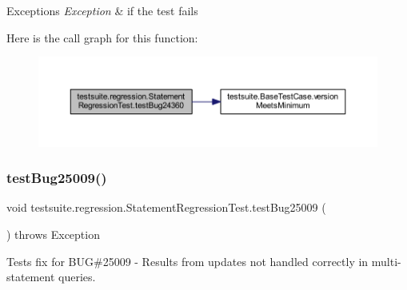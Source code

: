 \begin{DoxyExceptions}{Exceptions}
{\em Exception} & if the test fails \\
\hline
\end{DoxyExceptions}
Here is the call graph for this function\+:
\nopagebreak
\begin{figure}[H]
\begin{center}
\leavevmode
\includegraphics[width=350pt]{classtestsuite_1_1regression_1_1_statement_regression_test_a3334c82a4ef7ac982bf6eca6fc081027_cgraph}
\end{center}
\end{figure}
\mbox{\label{classtestsuite_1_1regression_1_1_statement_regression_test_a857b7ade8c7c4e47bd7f0c8340d91386}} 
\subsubsection{\texorpdfstring{test\+Bug25009()}{testBug25009()}}
{\footnotesize\ttfamily void testsuite.\+regression.\+Statement\+Regression\+Test.\+test\+Bug25009 (\begin{DoxyParamCaption}{ }\end{DoxyParamCaption}) throws Exception}

Tests fix for B\+UG\#25009 -\/ Results from updates not handled correctly in multi-\/statement queries.


